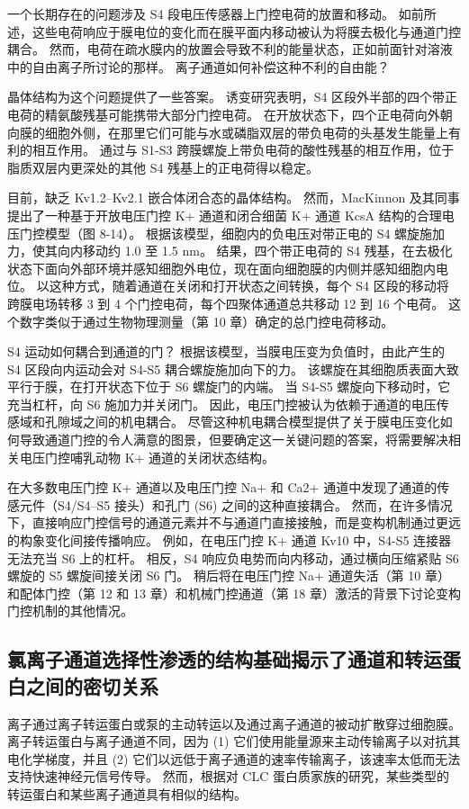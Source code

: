 一个长期存在的问题涉及 S4 段电压传感器上门控电荷的放置和移动。 
如前所述，这些电荷响应于膜电位的变化而在膜平面内移动被认为将膜去极化与通道门控耦合。 
然而，电荷在疏水膜内的放置会导致不利的能量状态，正如前面针对溶液中的自由离子所讨论的那样。 
离子通道如何补偿这种不利的自由能？


晶体结构为这个问题提供了一些答案。 
诱变研究表明，S4 区段外半部的四个带正电荷的精氨酸残基可能携带大部分门控电荷。 
在开放状态下，四个正电荷向外朝向膜的细胞外侧，在那里它们可能与水或磷脂双层的带负电荷的头基发生能量上有利的相互作用。 
通过与 S1-S3 跨膜螺旋上带负电荷的酸性残基的相互作用，位于脂质双层内更深处的其他 S4 残基上的正电荷得以稳定。


目前，缺乏 Kv1.2–Kv2.1 嵌合体闭合态的晶体结构。 然而，MacKinnon 及其同事提出了一种基于开放电压门控 K+ 通道和闭合细菌 K+ 通道 KcsA 结构的合理电压门控模型（图 8-14）。 
根据该模型，细胞内的负电压对带正电的 S4 螺旋施加力，使其向内移动约 1.0 至 1.5 nm。 
结果，四个带正电荷的 S4 残基，在去极化状态下面向外部环境并感知细胞外电位，现在面向细胞膜的内侧并感知细胞内电位。 
以这种方式，随着通道在关闭和打开状态之间转换，每个 S4 区段的移动将跨膜电场转移 3 到 4 个门控电荷，每个四聚体通道总共移动 12 到 16 个电荷。 
这个数字类似于通过生物物理测量（第 10 章）确定的总门控电荷移动。


S4 运动如何耦合到通道的门？ 
根据该模型，当膜电压变为负值时，由此产生的 S4 区段向内运动会对 S4-S5 耦合螺旋施加向下的力。 
该螺旋在其细胞质表面大致平行于膜，在打开状态下位于 S6 螺旋门的内端。 
当 S4-S5 螺旋向下移动时，它充当杠杆，向 S6 施加力并关闭门。 
因此，电压门控被认为依赖于通道的电压传感域和孔隙域之间的机电耦合。 
尽管这种机电耦合模型提供了关于膜电压变化如何导致通道门控的令人满意的图景，但要确定这一关键问题的答案，将需要解决相关电压门控哺乳动物 K+ 通道的关闭状态结构。


在大多数电压门控 K+ 通道以及电压门控 Na+ 和 Ca2+ 通道中发现了通道的传感元件（S4/S4–S5 接头）和孔门 (S6) 之间的这种直接耦合。 
然而，在许多情况下，直接响应门控信号的通道元素并不与通道门直接接触，而是变构机制通过更远的构象变化间接传播响应。 
例如，在电压门控 K+ 通道 Kv10 中，S4-S5 连接器无法充当 S6 上的杠杆。 
相反，S4 响应负电势而向内移动，通过横向压缩紧贴 S6 螺旋的 S5 螺旋间接关闭 S6 门。 
稍后将在电压门控 Na+ 通道失活（第 10 章）和配体门控（第 12 和 13 章）和机械门控通道（第 18 章）激活的背景下讨论变构门控机制的其他情况。


\subsection{氯离子通道选择性渗透的结构基础揭示了通道和转运蛋白之间的密切关系}
离子通过离子转运蛋白或泵的主动转运以及通过离子通道的被动扩散穿过细胞膜。 
离子转运蛋白与离子通道不同，因为 (1) 它们使用能量源来主动传输离子以对抗其电化学梯度，并且 (2) 它们以远低于离子通道的速率传输离子，该速率太低而无法支持快速神经元信号传导。 
然而，根据对 CLC 蛋白质家族的研究，某些类型的转运蛋白和某些离子通道具有相似的结构。



